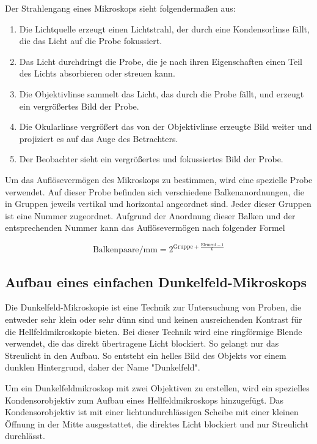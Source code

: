 \documentclass[12pt,english,ngerman]{scrartcl}
\begin{document}
Der Strahlengang eines Mikroskops sieht folgendermaßen aus:

\begin{enumerate}
	\item Die Lichtquelle erzeugt einen Lichtstrahl, der durch eine Kondensorlinse fällt,
	      die das Licht auf die Probe fokussiert.
	\item Das Licht durchdringt die Probe, die je nach ihren Eigenschaften einen Teil des
	      Lichts absorbieren oder streuen kann.
	\item Die Objektivlinse sammelt das Licht, das durch die Probe fällt, und erzeugt ein
	      vergrößertes Bild der Probe.
	\item Die Okularlinse vergrößert das von der Objektivlinse erzeugte Bild weiter und
	      projiziert es auf das Auge des Betrachters.
	\item Der Beobachter sieht ein vergrößertes und fokussiertes Bild der Probe.
\end{enumerate}

Um das Auflösevermögen des Mikroskops zu bestimmen, wird eine spezielle Probe
verwendet. Auf dieser Probe befinden sich verschiedene Balkenanordnungen, die
in Gruppen jeweils vertikal und horizontal angeordnet sind. Jeder dieser
Gruppen ist eine Nummer zugeordnet. Aufgrund der Anordnung dieser Balken und
der entsprechenden Nummer kann das Auflösevermögen nach folgender Formel

\begin{equation}
	\text{Balkenpaare} / \text{mm} = 2^{\text{Gruppe} + \frac{\text{Element}-1}{6}}
	\label{eq:auflosungsvermogen}
\end{equation}

\subsection{Aufbau eines einfachen Dunkelfeld-Mikroskops}
Die Dunkelfeld-Mikroskopie ist eine Technik zur Untersuchung von Proben, die
entweder sehr klein oder sehr dünn sind und keinen ausreichenden Kontrast für
die Hellfeldmikroskopie bieten. Bei dieser Technik wird eine ringförmige Blende
verwendet, die das direkt übertragene Licht blockiert. So gelangt nur das
Streulicht in den Aufbau. So entsteht ein helles Bild des Objekts vor einem
dunklen Hintergrund, daher der Name "Dunkelfeld".

Um ein Dunkelfeldmikroskop mit zwei Objektiven zu erstellen, wird ein
spezielles Kondensorobjektiv zum Aufbau eines Hellfeldmikroskops hinzugefügt.
Das Kondensorobjektiv ist mit einer lichtundurchlässigen Scheibe mit einer
kleinen Öffnung in der Mitte ausgestattet, die direktes Licht blockiert und nur
Streulicht durchlässt.
\end{document}
